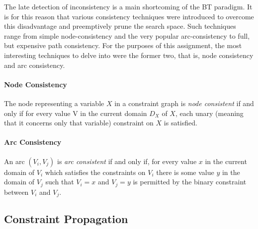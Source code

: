 The late detection of inconsistency is a main shortcoming of the BT paradigm. It is for this reason that various consistency techniques were introduced to overcome this disadvantage and preemptively prune the search space. Such techniques range from simple node-consistency and the very popular arc-consistency to full, but expensive path consistency.
For the purposes of this assignment, the most interesting techniques to delve into were the former two, that is, node consistency and arc consistency.

\paragraph{Node Consistency} The node representing a variable $X$ in a constraint graph is \textit{node consistent} if and only if for every value V in the current domain $D_X$ of $X$, each unary (meaning that it concerns only that variable) constraint on $X$ is satisfied.

\paragraph{Arc Consistency} An arc $(V_i, V_j)$ is \textit{arc consistent} if and only if, for every value $x$ in the current domain of $V_i$ which satisfies the constraints on $V_i$ there is some value $y$ in the domain of $V_j$ such that $V_i = x$ and $V_j = y$ is
permitted by the binary constraint between $V_i$ and $V_j$.

\subsection{Constraint Propagation}

